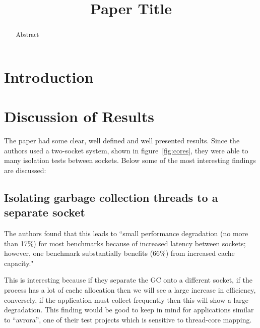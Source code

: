 \documentclass[conference]{IEEEtran}
\begin{document}
\title{Paper Title}

\author{
}

\maketitle

\begin{abstract}
Abstract
\end{abstract}


\section{Introduction}

\section{Discussion of Results}
The paper had some clear, well defined and well presented results.  Since the authors used a two-socket system, shown in figure~\ref{fig:cores}, they were able to many isolation tests between sockets.  Below some of the most interesting findings are discussed: \\  %

\subsection{Isolating garbage collection threads to a separate socket}
 
The authors found that this leads to ``small performance degradation (no more than 17\%) for most benchmarks because of increased latency between sockets; however, one benchmark substantially benefits (66\%) from increased cache capacity."

This is interesting because if they separate the GC onto a different socket, if the process has a lot of cache allocation then we will see a large increase in efficiency, conversely, if the application must collect frequently then this will show a large degradation.  This finding would be good to keep in mind for applications similar to ``avrora'', one of their test projects which is sensitive to thread-core mapping.
\end{document}
